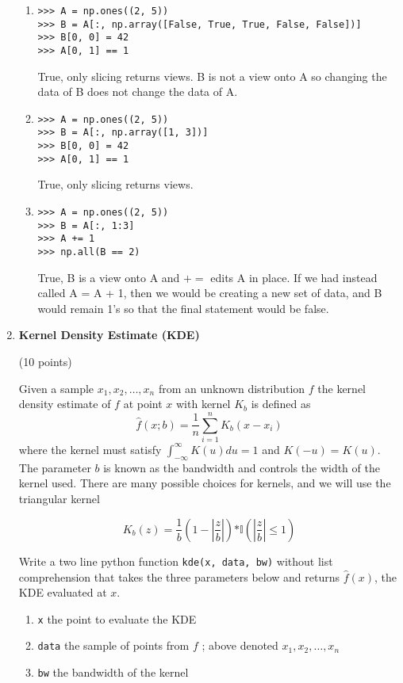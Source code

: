 \documentclass{article}
\newcounter{points}
\newcommand\setpoints[1]{\addtocounter{points}{#1}(#1 points)}
\begin{document}
\begin{enumerate}
\begin{enumerate}
\item  

\begin{verbatim}
>>> A = np.ones((2, 5))
>>> B = A[:, np.array([False, True, True, False, False])]
>>> B[0, 0] = 42
>>> A[0, 1] == 1
\end{verbatim}
True, only slicing returns views. B is not a view onto A so changing the data of B does not change the data of A.

\item  

\begin{verbatim}
>>> A = np.ones((2, 5))
>>> B = A[:, np.array([1, 3])]
>>> B[0, 0] = 42
>>> A[0, 1] == 1
\end{verbatim}
True, only slicing returns views.
\item  

\begin{verbatim}
>>> A = np.ones((2, 5))
>>> B = A[:, 1:3]
>>> A += 1
>>> np.all(B == 2)
\end{verbatim}
True, B is a view onto A and $+=$ edits A in place. If we had instead called A = A + 1, then we would be creating a new set of data, and B would remain 1's so that the final statement would be false.
\end{enumerate}


\newpage
\item \textbf{Kernel Density Estimate (KDE)} \setpoints{10}

Given a sample $x_1, x_2, \dots, x_n$ from an unknown distribution $f$ the kernel density estimate of $f$ at point $x$ with kernel $K_b$ is defined as 
$$\hat{f}(x;b) = \frac{1}{n}\sum_{i=1}^{n}K_b(x-x_i)$$
where the kernel must satisfy $\int_{-\infty}^{\infty}K(u)du = 1$ and $K(-u) = K(u).$ The parameter $b$ is known as the bandwidth and controls the width of the kernel used. There are many possible choices for kernels, and we will use the triangular kernel

$$K_{b}(z) = \frac{1}{b}(1 - |\frac{z}{b}|)\mathbb{*I}(|\frac{z}{b}| \leq 1)$$ 

Write a two line python function \texttt{kde(x, data, bw)} without list comprehension that takes the three parameters below and returns $\hat{f}(x)$, the KDE evaluated at $x$.
\begin{enumerate}
\item \texttt{x} the point to evaluate the KDE
\item \texttt{data}  the sample of points from $f$  ; above denoted $x_1, x_2, \dots, x_n$ 
\item \texttt{bw} the bandwidth of the kernel
\end{enumerate}


\end{enumerate}
\end{document}
